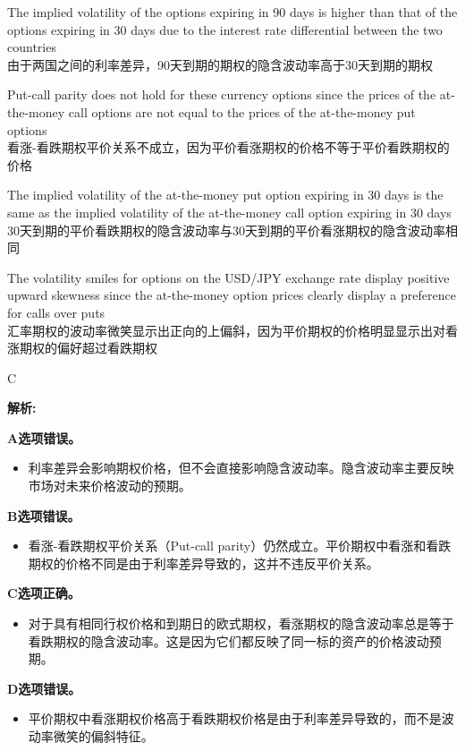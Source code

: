 \documentclass{article}
\newenvironment{explanation}
{\textbf{解析:}\par}
{\par}
\begin{document}
\begin{choices}
    \item The implied volatility of the options expiring in 90 days is higher than that of the options expiring in 30 days due to the interest rate differential between the two countries
    \\ 由于两国之间的利率差异，90天到期的期权的隐含波动率高于30天到期的期权
    \item Put-call parity does not hold for these currency options since the prices of the at-the-money call options are not equal to the prices of the at-the-money put options
    \\ 看涨-看跌期权平价关系不成立，因为平价看涨期权的价格不等于平价看跌期权的价格
    \item The implied volatility of the at-the-money put option expiring in 30 days is the same as the implied volatility of the at-the-money call option expiring in 30 days
    \\ 30天到期的平价看跌期权的隐含波动率与30天到期的平价看涨期权的隐含波动率相同
    \item The volatility smiles for options on the USD/JPY exchange rate display positive upward skewness since the at-the-money option prices clearly display a preference for calls over puts
    \\ 汇率期权的波动率微笑显示出正向的上偏斜，因为平价期权的价格明显显示出对看涨期权的偏好超过看跌期权
\end{choices}

\begin{correctanswer}
    C
\end{correctanswer}

\begin{explanation}
    \textbf{A选项错误。}
    \begin{itemize}
        \item 利率差异会影响期权价格，但不会直接影响隐含波动率。隐含波动率主要反映市场对未来价格波动的预期。
    \end{itemize}
    
    \textbf{B选项错误。}
    \begin{itemize}
        \item 看涨-看跌期权平价关系（Put-call parity）仍然成立。平价期权中看涨和看跌期权的价格不同是由于利率差异导致的，这并不违反平价关系。
    \end{itemize}
    
    \textbf{C选项正确。}
    \begin{itemize}
        \item 对于具有相同行权价格和到期日的欧式期权，看涨期权的隐含波动率总是等于看跌期权的隐含波动率。这是因为它们都反映了同一标的资产的价格波动预期。
    \end{itemize}
    
    \textbf{D选项错误。}
    \begin{itemize}
        \item 平价期权中看涨期权价格高于看跌期权价格是由于利率差异导致的，而不是波动率微笑的偏斜特征。
    \end{itemize}
\end{explanation}
\end{document}
